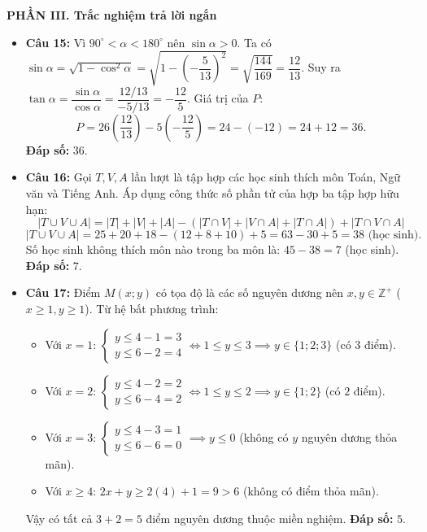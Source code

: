 \documentclass[12pt,a4paper]{article}
\begin{document}
\vspace{0.2cm}
\textbf{PHẦN III. Trắc nghiệm trả lời ngắn}
\begin{itemize}[leftmargin=0.6cm, itemsep=3pt]
    \item \textbf{Câu 15:} Vì $90^\circ < \alpha < 180^\circ$ nên $\sin \alpha > 0$.
    Ta có $\sin \alpha = \sqrt{1 - \cos^2 \alpha} = \sqrt{1 - \left(-\dfrac{5}{13}\right)^2} = \sqrt{\dfrac{144}{169}} = \dfrac{12}{13}$.
    Suy ra $\tan \alpha = \dfrac{\sin \alpha}{\cos \alpha} = \dfrac{12/13}{-5/13} = -\dfrac{12}{5}$.
    Giá trị của $P$:
    \[
    P = 26\left(\dfrac{12}{13}\right) - 5\left(-\dfrac{12}{5}\right) = 24 - (-12) = 24 + 12 = 36.
    \]
    \textbf{Đáp số:} $36$.

    \item \textbf{Câu 16:} Gọi $T, V, A$ lần lượt là tập hợp các học sinh thích môn Toán, Ngữ văn và Tiếng Anh.
    Áp dụng công thức số phần tử của hợp ba tập hợp hữu hạn:
    \[
    |T \cup V \cup A| = |T| + |V| + |A| - (|T \cap V| + |V \cap A| + |T \cap A|) + |T \cap V \cap A|
    \]
    \[
    |T \cup V \cup A| = 25 + 20 + 18 - (12 + 8 + 10) + 5 = 63 - 30 + 5 = 38\text{ (học sinh)}.
    \]
    Số học sinh không thích môn nào trong ba môn là: $45 - 38 = 7$ (học sinh).
    \textbf{Đáp số:} $7$.

    \item \textbf{Câu 17:} Điểm $M(x; y)$ có tọa độ là các số nguyên dương nên $x, y \in \mathbb{Z}^+$ ($x \ge 1, y \ge 1$).
    Từ hệ bất phương trình:
    \begin{itemize}
        \item Với $x = 1$: $\begin{cases} y \le 4 - 1 = 3 \\ y \le 6 - 2 = 4 \end{cases} \iff 1 \le y \le 3 \implies y \in \{1; 2; 3\}$ (có $3$ điểm).
        \item Với $x = 2$: $\begin{cases} y \le 4 - 2 = 2 \\ y \le 6 - 4 = 2 \end{cases} \iff 1 \le y \le 2 \implies y \in \{1; 2\}$ (có $2$ điểm).
        \item Với $x = 3$: $\begin{cases} y \le 4 - 3 = 1 \\ y \le 6 - 6 = 0 \end{cases} \implies y \le 0$ (không có $y$ nguyên dương thỏa mãn).
        \item Với $x \ge 4$: $2x + y \ge 2(4) + 1 = 9 > 6$ (không có điểm thỏa mãn).
    \end{itemize}
    Vậy có tất cả $3 + 2 = 5$ điểm nguyên dương thuộc miền nghiệm.
    \textbf{Đáp số:} $5$.


\end{itemize}
\end{document}

